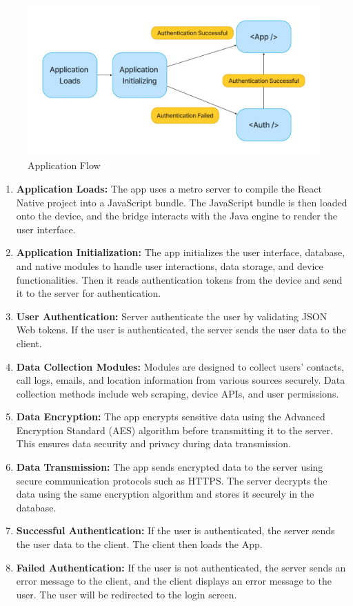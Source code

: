 \begin{figure}
    \centering
    \includegraphics[width=1\linewidth]{Media//Application_Flow}
    \caption{Application Flow}
    \label{fig:Application Flow}
\end{figure}

\begin{enumerate}[label=\roman*.]
    \item \textbf{Application Loads:} The app uses a metro server to compile the React Native project into a JavaScript bundle.
    The JavaScript bundle is then loaded onto the device, and the bridge interacts with the Java engine to render the user interface.
    \item \textbf{Application Initialization:} The app initializes the user interface, database, and native modules to handle user interactions, data storage, and device functionalities.
    Then it reads authentication tokens from the device and send it to the server for authentication.
    \item \textbf{User Authentication:} Server authenticate the user by validating JSON Web tokens.
    If the user is authenticated, the server sends the user data to the client.
    \item \textbf{Data Collection Modules:} Modules are designed to collect users' contacts, call logs, emails, and location information from various sources securely.
    Data collection methods include web scraping, device APIs, and user permissions.
    \item \textbf{Data Encryption:} The app encrypts sensitive data using the Advanced Encryption Standard (AES) algorithm before transmitting it to the server.
    This ensures data security and privacy during data transmission.
    \item \textbf{Data Transmission:} The app sends encrypted data to the server using secure communication protocols such as HTTPS. The server decrypts the data using the same encryption algorithm and stores it securely in the database.
    \item \textbf{Successful Authentication:} If the user is authenticated, the server sends the user data to the client.
    The client then loads the App.
    \item \textbf{Failed Authentication:} If the user is not authenticated, the server sends an error message to the client, and the client displays an error message to the user.
    The user will be redirected to the login screen.
\end{enumerate}

